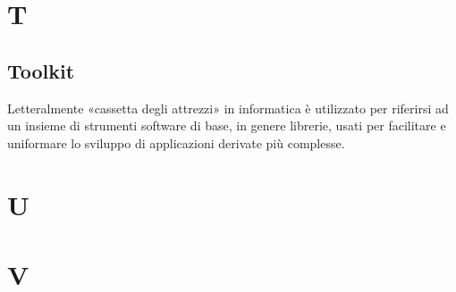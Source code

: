 \clearpage
\section*{T}





\subsection*{Toolkit}
Letteralmente «cassetta degli attrezzi» in informatica è utilizzato per riferirsi ad un insieme di strumenti software di base, in genere librerie, usati per facilitare e uniformare lo sviluppo di applicazioni derivate più complesse. 

\clearpage
\section*{U}

\clearpage
\section*{V}


